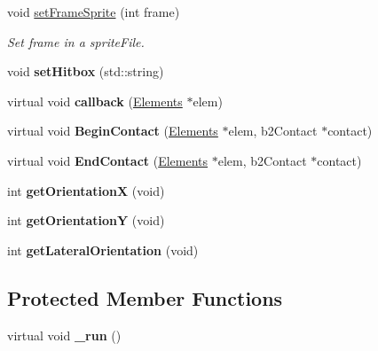 \begin{DoxyCompactItemize}
\item 
void \hyperlink{class_elements_a3bb4cc2e2009d0e447fbdd0212a57b73}{set\-Frame\-Sprite} (int frame)
\begin{DoxyCompactList}\small\item\em Set frame in a sprite\-File. \end{DoxyCompactList}\item 
\hypertarget{class_elements_ad7e4ecb2ecc2402cf892e60d8d803070}{void {\bfseries set\-Hitbox} (std\-::string)}\label{class_elements_ad7e4ecb2ecc2402cf892e60d8d803070}

\item 
\hypertarget{class_elements_a85bc66fe037551fcfa0b606cf32c4478}{virtual void {\bfseries callback} (\hyperlink{class_elements}{Elements} $\ast$elem)}\label{class_elements_a85bc66fe037551fcfa0b606cf32c4478}

\item 
\hypertarget{class_elements_a108938e08197adc349e98fb91abe1b5a}{virtual void {\bfseries Begin\-Contact} (\hyperlink{class_elements}{Elements} $\ast$elem, b2\-Contact $\ast$contact)}\label{class_elements_a108938e08197adc349e98fb91abe1b5a}

\item 
\hypertarget{class_elements_a42c3b694edefcc789109bd952a66d918}{virtual void {\bfseries End\-Contact} (\hyperlink{class_elements}{Elements} $\ast$elem, b2\-Contact $\ast$contact)}\label{class_elements_a42c3b694edefcc789109bd952a66d918}

\item 
\hypertarget{class_elements_a2dd2e1e757c9077755bbe309c504740b}{int {\bfseries get\-Orientation\-X} (void)}\label{class_elements_a2dd2e1e757c9077755bbe309c504740b}

\item 
\hypertarget{class_elements_a58d9facbd7f6264e8b4e2ff49f20d939}{int {\bfseries get\-Orientation\-Y} (void)}\label{class_elements_a58d9facbd7f6264e8b4e2ff49f20d939}

\item 
\hypertarget{class_elements_add4340c523571631da317d8a64fc1368}{int {\bfseries get\-Lateral\-Orientation} (void)}\label{class_elements_add4340c523571631da317d8a64fc1368}

\end{DoxyCompactItemize}
\subsection*{Protected Member Functions}
\begin{DoxyCompactItemize}
\item 
\hypertarget{class_elements_aa367c1471a9fc7f1a9b7b124e69c3ef3}{virtual void {\bfseries \-\_\-run} ()}\label{class_elements_aa367c1471a9fc7f1a9b7b124e69c3ef3}

\end{DoxyCompactItemize}

